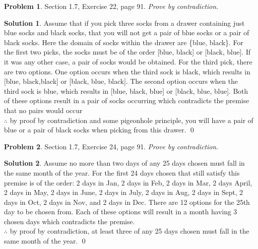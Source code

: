\documentclass{article}
\theoremstyle{definition}
\newtheorem{problem}{Problem}
\newtheorem*{solution}{Solution}
\begin{document}
\begin{problem} Section 1.7, Exercise 22, page 91.  \textsl{Prove by contradiction.}
\end{problem}
\begin{solution}
Assume that if you pick three socks from a drawer containing just blue socks and black socks, that you will not get a pair of blue socks or a pair of black socks. Here the domain of socks within the drawer are \{blue, black\}. For the first two picks, the socks must be of the order [blue, black] or [black, blue]. If it was any other case, a pair of socks would be obtained. For the third pick, there are two options. One option occurs when the third sock is black, which results in [blue, black,black] or [black, blue, black]. The second option occurs when the third sock is blue, which results in [blue, black, blue] or [black, blue, blue]. Both of these options result in a pair of socks occurring which contradicts the premise that no pairs would occur \\
$\therefore$ by proof by contradiction and some pigeonhole principle, you will have a pair of blue or a pair of black socks when picking from this drawer. \qed
\end{solution}

\begin{problem} Section 1.7, Exercise 24, page 91.  \textsl{Prove by contradiction.}
\end{problem}
\begin{solution}
Assume no more than two days of any 25 days chosen must fall in the same month of the year. For the first 24 days chosen that still satisfy this premise is of the order: 2 days in Jan, 2 days in Feb, 2 days in Mar, 2 days April, 2 days in May, 2 days in June, 2 days in July, 2 days in Aug, 2 days in Sept, 2 days in Oct, 2 days in Nov, and 2 days in Dec. There are 12 options for the 25th day to be chosen from. Each of these options will result in a month having 3 chosen days which contradicts the premise. \\
$\therefore$ by proof by contradiction, at least three of any 25 days chosen must fall in the same month of the year. \qed
\end{solution}
\end{document}
